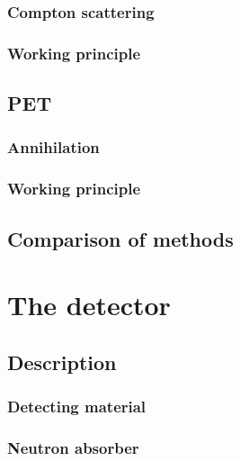 \subsubsection{Compton scattering}

\subsubsection{Working principle}

\subsection{PET}

\subsubsection{Annihilation}

\subsubsection{Working principle}

\subsection{Comparison of methods}

\section{The detector}

\subsection{Description}

\subsubsection{Detecting material}

\subsubsection{Neutron absorber}

